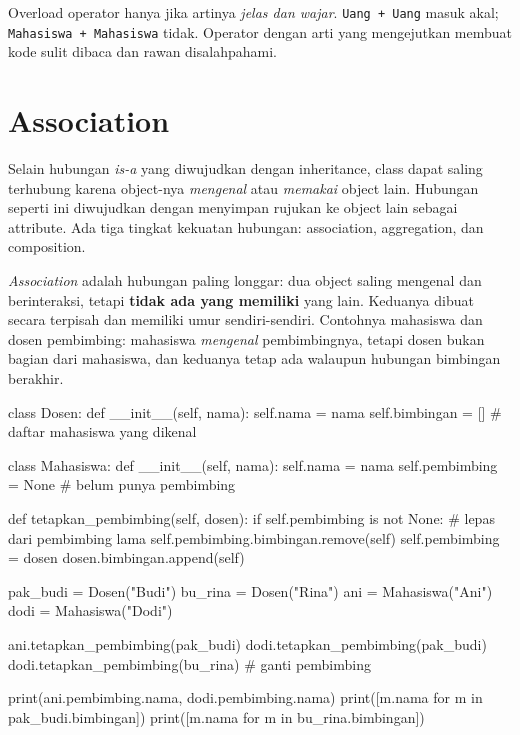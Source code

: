 \begin{penting}
Overload operator hanya jika artinya \emph{jelas dan wajar}. \texttt{Uang + Uang} masuk akal; \texttt{Mahasiswa + Mahasiswa} tidak. Operator dengan arti yang mengejutkan membuat kode sulit dibaca dan rawan disalahpahami.
\end{penting}

\section{Association}

Selain hubungan \emph{is-a} yang diwujudkan dengan inheritance, class dapat saling terhubung karena object-nya \emph{mengenal} atau \emph{memakai} object lain. Hubungan seperti ini diwujudkan dengan menyimpan rujukan ke object lain sebagai attribute. Ada tiga tingkat kekuatan hubungan: association, aggregation, dan composition.

\emph{Association} adalah hubungan paling longgar: dua object saling mengenal dan berinteraksi, tetapi \textbf{tidak ada yang memiliki} yang lain. Keduanya dibuat secara terpisah dan memiliki umur sendiri-sendiri. Contohnya mahasiswa dan dosen pembimbing: mahasiswa \emph{mengenal} pembimbingnya, tetapi dosen bukan bagian dari mahasiswa, dan keduanya tetap ada walaupun hubungan bimbingan berakhir.

\begin{kode}
class Dosen:
    def __init__(self, nama):
        self.nama = nama
        self.bimbingan = []               # daftar mahasiswa yang dikenal

class Mahasiswa:
    def __init__(self, nama):
        self.nama = nama
        self.pembimbing = None            # belum punya pembimbing

    def tetapkan_pembimbing(self, dosen):
        if self.pembimbing is not None:   # lepas dari pembimbing lama
            self.pembimbing.bimbingan.remove(self)
        self.pembimbing = dosen
        dosen.bimbingan.append(self)

pak_budi = Dosen("Budi")
bu_rina = Dosen("Rina")
ani = Mahasiswa("Ani")
dodi = Mahasiswa("Dodi")

ani.tetapkan_pembimbing(pak_budi)
dodi.tetapkan_pembimbing(pak_budi)
dodi.tetapkan_pembimbing(bu_rina)        # ganti pembimbing

print(ani.pembimbing.nama, dodi.pembimbing.nama)
print([m.nama for m in pak_budi.bimbingan])
print([m.nama for m in bu_rina.bimbingan])
\end{kode}

